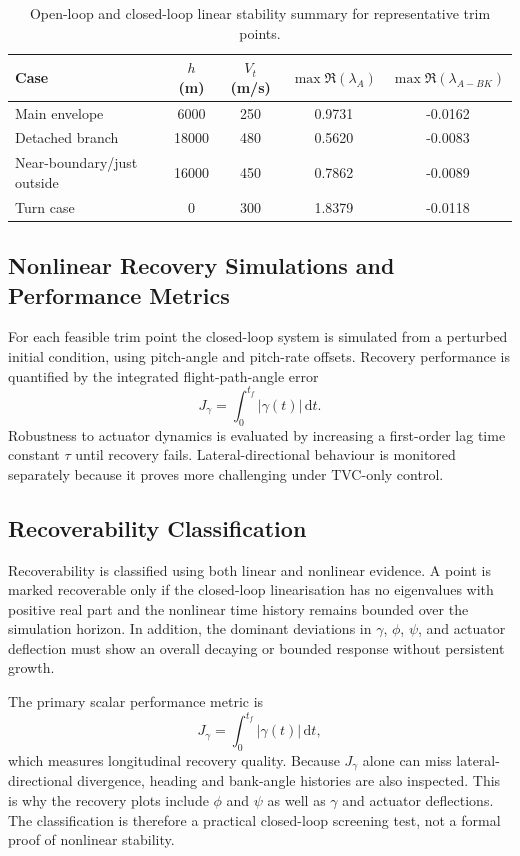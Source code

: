 \documentclass[conf]{new-aiaa}
\begin{document}
\begin{table}[h]
\centering
\footnotesize
\caption{Open-loop and closed-loop linear stability summary for representative trim points.}
\label{tab:eigenvalue_summary}
\begin{tabular}{lcccc}
\toprule
Case & $h$ (m) & $V_t$ (m/s) & $\max\Re(\lambda_A)$ & $\max\Re(\lambda_{A-BK})$ \\
\midrule
Main envelope & 6000 & 250 & 0.9731 & -0.0162 \\
Detached branch & 18000 & 480 & 0.5620 & -0.0083 \\
Near-boundary/just outside & 16000 & 450 & 0.7862 & -0.0089 \\
Turn case & 0 & 300 & 1.8379 & -0.0118 \\
\bottomrule
\end{tabular}
\end{table}

\subsection{Nonlinear Recovery Simulations and Performance Metrics}
For each feasible trim point the closed-loop system is simulated from a perturbed initial condition, using pitch-angle and pitch-rate offsets. Recovery performance is quantified by the integrated flight-path-angle error
\[
J_\gamma = \int_0^{t_f} |\gamma(t)|\,\mathrm{d}t.
\]
Robustness to actuator dynamics is evaluated by increasing a first-order lag time constant $\tau$ until recovery fails. Lateral-directional behaviour is monitored separately because it proves more challenging under TVC-only control.

\subsection{Recoverability Classification}
Recoverability is classified using both linear and nonlinear evidence. A point is marked recoverable only if the closed-loop linearisation has no eigenvalues with positive real part and the nonlinear time history remains bounded over the simulation horizon. In addition, the dominant deviations in $\gamma$, $\phi$, $\psi$, and actuator deflection must show an overall decaying or bounded response without persistent growth.

The primary scalar performance metric is
\[
J_\gamma = \int_0^{t_f} |\gamma(t)|\,\mathrm{d}t,
\]
which measures longitudinal recovery quality. Because $J_\gamma$ alone can miss lateral-directional divergence, heading and bank-angle histories are also inspected. This is why the recovery plots include $\phi$ and $\psi$ as well as $\gamma$ and actuator deflections. The classification is therefore a practical closed-loop screening test, not a formal proof of nonlinear stability.
\end{document}
